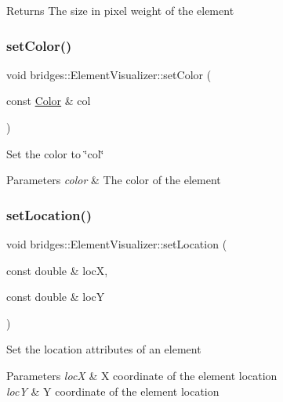 \begin{DoxyReturn}{Returns}
The size in pixel weight of the element 
\end{DoxyReturn}
\hypertarget{classbridges_1_1_element_visualizer_af14723066e52c159eebfb804d65dd825}{}\label{classbridges_1_1_element_visualizer_af14723066e52c159eebfb804d65dd825} 
\subsubsection{\texorpdfstring{set\+Color()}{setColor()}}
{\footnotesize\ttfamily void bridges\+::\+Element\+Visualizer\+::set\+Color (\begin{DoxyParamCaption}\item[{const \hyperlink{classbridges_1_1_color}{Color} \&}]{col }\end{DoxyParamCaption})\hspace{0.3cm}{\ttfamily [inline]}}

Set the color to \char`\"{}col\char`\"{} 
\begin{DoxyParams}{Parameters}
{\em color} & The color of the element \\
\hline
\end{DoxyParams}
\hypertarget{classbridges_1_1_element_visualizer_ad06f2fd509f6b3474feeb4fa1fef38d5}{}\label{classbridges_1_1_element_visualizer_ad06f2fd509f6b3474feeb4fa1fef38d5} 
\subsubsection{\texorpdfstring{set\+Location()}{setLocation()}}
{\footnotesize\ttfamily void bridges\+::\+Element\+Visualizer\+::set\+Location (\begin{DoxyParamCaption}\item[{const double \&}]{locX,  }\item[{const double \&}]{locY }\end{DoxyParamCaption})\hspace{0.3cm}{\ttfamily [inline]}}

Set the location attributes of an element


\begin{DoxyParams}{Parameters}
{\em locX} & X coordinate of the element location \\
\hline
{\em locY} & Y coordinate of the element location \\
\hline
\end{DoxyParams}
\hypertarget{classbridges_1_1_element_visualizer_a8f77db4a2774021aec4ab8ea18e50fc9}{}\label{classbridges_1_1_element_visualizer_a8f77db4a2774021aec4ab8ea18e50fc9} 
